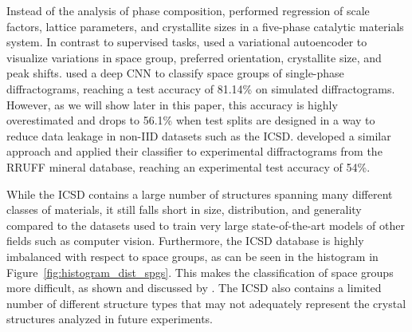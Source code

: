 Instead of the analysis of phase composition,
\citeauthor{dongDeepConvolutionalNeural2021} performed regression of scale
factors, lattice parameters, and crystallite sizes in a five-phase catalytic
materials system\supercite{dongDeepConvolutionalNeural2021}. In contrast to
supervised tasks, \citeauthor{bankoDeepLearningVisualization2021} used a
variational autoencoder to visualize variations in space group, preferred
orientation, crystallite size, and peak
shifts\supercite{bankoDeepLearningVisualization2021}.
\citeauthor{parkClassificationCrystalStructure2017} used a deep CNN to classify
space groups of single-phase diffractograms, reaching a test accuracy of 81.14\%
on simulated diffractograms.\supercite{parkClassificationCrystalStructure2017} 
However, as we will show later in this paper, this accuracy is highly overestimated and drops to 56.1\% when test splits are designed in a way to reduce data leakage in non-IID datasets such as the ICSD.
\citeauthor{vecseiNeuralNetworkBased2019}\supercite{vecseiNeuralNetworkBased2019} developed
a similar approach and applied their classifier to experimental diffractograms
from the RRUFF mineral database\supercite{lafuentePowerDatabasesRRUFF2015},
reaching an experimental test accuracy of 54\%.

While the ICSD contains a large number of structures spanning many different
classes of materials, it still falls short in size, distribution, and generality
compared to the datasets used to train very large state-of-the-art models of
other fields such as computer vision.
Furthermore, the ICSD
database is highly imbalanced with respect to space groups, as can be seen
in the histogram in Figure~\ref{fig:histogram_dist_spgs}. This makes the classification of
space groups more difficult, as shown and discussed by
\citeauthor{zalogaCrystalSymmetryClassification2020}
\supercite{zalogaCrystalSymmetryClassification2020}. The ICSD also contains a
limited number of different structure types that may not adequately represent
the crystal structures analyzed in future experiments.


